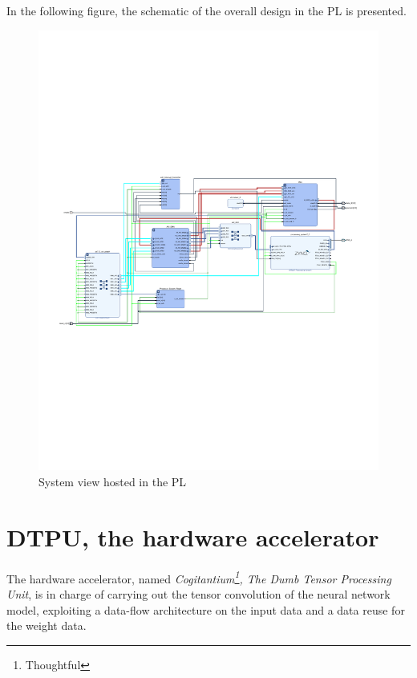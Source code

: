 \newpage
In the following figure, the schematic of the overall design in the PL is presented.
\begin{figure}[!htbp]
\centering
\captionsetup{justification=centering}
\includegraphics[scale=1,angle=90]{./figure/system_schematic.pdf}
\caption{System view hosted in the PL \protect\footnotemark}
\label{fig:sys}
\end{figure}
\section{DTPU, the hardware accelerator}
The hardware accelerator, named \textit{Cogitantium\footnote{Thoughtful}, The Dumb Tensor Processing Unit}, is in charge of carrying out the tensor convolution of the neural network model, exploiting a data-flow architecture on the input data and a data reuse for the weight data.

